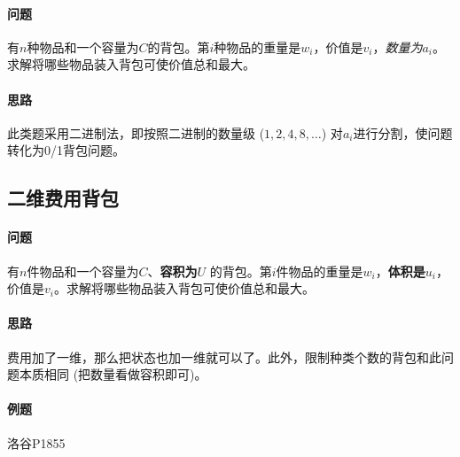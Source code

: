 \paragraph{问题} 有$n$种物品和一个容量为$C$的背包。第$i$种物品的重量是$w_i$，价值是$v_i$，\emph{数量为$a_i$}。求解将哪些物品装入背包可使价值总和最大。

\paragraph{思路} 此类题采用二进制法，即按照二进制的数量级 ($1, 2, 4, 8, \ldots$) 对$a_i$进行分割，使问题转化为0/1背包问题。



\subsection{二维费用背包}

\paragraph{问题} 有$n$件物品和一个容量为$C$、\textbf{容积为$U$} 的背包。第$i$件物品的重量是$w_i$，\textbf{体积是$u_i$}，价值是$v_i$。求解将哪些物品装入背包可使价值总和最大。

\paragraph{思路} 费用加了一维，那么把状态也加一维就可以了。此外，限制种类个数的背包和此问题本质相同 (把数量看做容积即可)。

\paragraph{例题} 洛谷P1855


